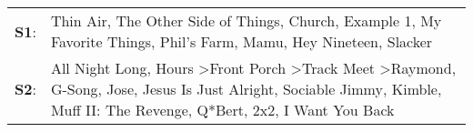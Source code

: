 \begin{supertabular}{p{0.03\textwidth}p{0.92\textwidth}}
 \textbf{S1}:  &                                                                                                                                                                                                                                  Thin Air\textsuperscript{}, \enspace The Other Side of Things\textsuperscript{}, \enspace Church\textsuperscript{}, \enspace Example 1\textsuperscript{}, \enspace My Favorite Things\textsuperscript{}, \enspace Phil's Farm\textsuperscript{}, \enspace Mamu\textsuperscript{}, \enspace Hey Nineteen\textsuperscript{}, \enspace Slacker\textsuperscript{}  \enspace  \\
 \textbf{S2}:  &  All Night Long\textsuperscript{}, \enspace Hours\textsuperscript{} \textgreater \enspace Front Porch\textsuperscript{} \textgreater \enspace Track Meet\textsuperscript{} \textgreater \enspace Raymond\textsuperscript{}, \enspace G-Song\textsuperscript{}, \enspace Jose\textsuperscript{}, \enspace Jesus Is Just Alright\textsuperscript{}, \enspace Sociable Jimmy\textsuperscript{}, \enspace Kimble\textsuperscript{}, \enspace Muff II: The Revenge\textsuperscript{}, \enspace Q*Bert\textsuperscript{}, \enspace 2x2\textsuperscript{}, \enspace I Want You Back\textsuperscript{}  \enspace  \\
\end{supertabular}
